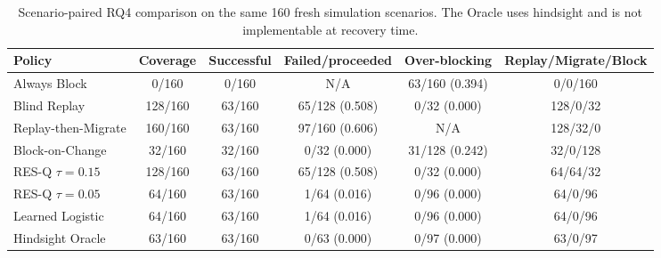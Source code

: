 \begin{table}[t]
\centering
\small
\begin{tabular}{@{}lccccc@{}}
\toprule
Policy & Coverage & Successful & Failed/proceeded & Over-blocking & Replay/Migrate/Block \\
\midrule
Always Block & 0/160 & 0/160 & N/A & 63/160 (0.394) & 0/0/160 \\
Blind Replay & 128/160 & 63/160 & 65/128 (0.508) & 0/32 (0.000) & 128/0/32 \\
Replay-then-Migrate & 160/160 & 63/160 & 97/160 (0.606) & N/A & 128/32/0 \\
Block-on-Change & 32/160 & 32/160 & 0/32 (0.000) & 31/128 (0.242) & 32/0/128 \\
RES-Q $\tau=0.15$ & 128/160 & 63/160 & 65/128 (0.508) & 0/32 (0.000) & 64/64/32 \\
RES-Q $\tau=0.05$ & 64/160 & 63/160 & 1/64 (0.016) & 0/96 (0.000) & 64/0/96 \\
Learned Logistic & 64/160 & 63/160 & 1/64 (0.016) & 0/96 (0.000) & 64/0/96 \\
Hindsight Oracle & 63/160 & 63/160 & 0/63 (0.000) & 0/97 (0.000) & 63/0/97 \\
\bottomrule
\end{tabular}
\caption{Scenario-paired RQ4 comparison on the same 160 fresh simulation scenarios. The Oracle uses hindsight and is not implementable at recovery time.}
\label{tab:rq4-policy-comparison-final}
\end{table}
